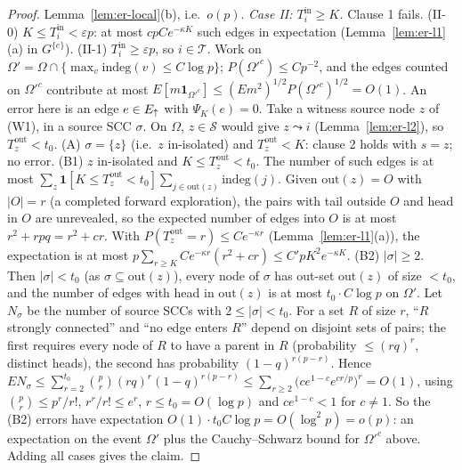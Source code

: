 \begin{proof}
Lemma~\ref{lem:er-local}(b), i.e.\ $o(p)$.
\emph{Case II: $T^{\mathrm{in}}_i\ge K$.} Clause 1 fails.
(II-0) $K\le T^{\mathrm{in}}_i<\varepsilon p$: at most $cpCe^{-\kappa K}$ such
edges in expectation (Lemma~\ref{lem:er-l1}(a) in $G^{\{e\}}$).
(II-1) $T^{\mathrm{in}}_i\ge\varepsilon p$, so $i\in\mathcal T$. Work on
$\Omega'=\Omega\cap\{\max_v\mathrm{indeg}(v)\le C\log p\}$; $P(\Omega'^c)\le Cp^{-2}$,
and the edges counted on $\Omega'^c$ contribute at most
$E[m\mathbf 1_{\Omega'^c}]\le(Em^2)^{1/2}P(\Omega'^c)^{1/2}=O(1)$. An error here is
an edge $e\in E_{\uparrow}$ with $\Psi_K(e)=0$. Take a witness source node $z$ of (W1),
in a source SCC $\sigma$. On $\Omega$, $z\in\mathcal S$ would give $z\leadsto i$
(Lemma~\ref{lem:er-l2}), so $T^{\mathrm{out}}_z<t_0$.
(A) $\sigma=\{z\}$ (i.e.\ $z$ in-isolated) and $T^{\mathrm{out}}_z<K$: clause 2
holds with $s=z$; no error.
(B1) $z$ in-isolated and $K\le T^{\mathrm{out}}_z<t_0$. The number of such edges
is at most $\sum_z\mathbf 1[K\le T^{\mathrm{out}}_z<t_0]\sum_{j\in\mathrm{out}(z)}\mathrm{indeg}(j)$.
Given $\mathrm{out}(z)=O$ with $|O|=r$ (a completed forward exploration), the
pairs with tail outside $O$ and head in $O$ are unrevealed, so the expected
number of edges into $O$ is at most $r^2+rpq=r^2+cr$. With
$P(T^{\mathrm{out}}_z=r)\le Ce^{-\kappa r}$ (Lemma~\ref{lem:er-l1}(a)), the
expectation is at most $p\sum_{r\ge K}Ce^{-\kappa r}(r^2+cr)\le C'pK^2e^{-\kappa K}$.
(B2) $|\sigma|\ge2$. Then $|\sigma|<t_0$ (as $\sigma\subseteq\mathrm{out}(z)$),
every node of $\sigma$ has out-set $\mathrm{out}(z)$ of size $<t_0$, and the
number of edges with head in $\mathrm{out}(z)$ is at most $t_0\cdot C\log p$ on
$\Omega'$. Let $N_\sigma$ be the number of source SCCs with $2\le|\sigma|<t_0$.
For a set $R$ of size $r$, ``$R$ strongly connected'' and ``no edge enters $R$''
depend on disjoint sets of pairs; the first requires every node of $R$ to have
a parent in $R$ (probability $\le(rq)^r$, distinct heads), the second has
probability $(1-q)^{r(p-r)}$. Hence
$EN_\sigma\le\sum_{r=2}^{t_0}\binom pr(rq)^r(1-q)^{r(p-r)}\le\sum_{r\ge2}\big(ce^{1-c}e^{cr/p}\big)^r=O(1)$,
using $\binom pr\le p^r/r!$, $r^r/r!\le e^r$, $r\le t_0=O(\log p)$ and
$ce^{1-c}<1$ for $c\ne1$. So the (B2) errors have expectation
$O(1)\cdot t_0C\log p=O(\log^2p)=o(p)$: an expectation on the event $\Omega'$ plus
the Cauchy--Schwarz bound for $\Omega'^c$ above.
Adding all cases gives the claim.
\end{proof}

